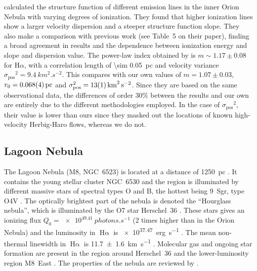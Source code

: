 \documentclass[fleqn,usenatbib, useAMS, a4paper]{mnras}
\newcounter{ionstage}
\renewcommand{\ion}[2]{\setcounter{ionstage}{#2}%
  \ensuremath{\mathrm{#1\,\scriptstyle\Roman{ionstage}}}}
\newcommand\hii{\ion{H}{2}}
\newcommand\pos{\ensuremath{_{\mathrm{pos}}}}
\newcommand\halpha{H${\alpha}$}
\newcommand\ha{\ensuremath{\text{H}\upalpha}}
\begin{document}
\citet{arthur2016turbulence} calculated the structure function of different emission lines in the inner Orion Nebula with varying degrees of ionization. 
They found that higher ionization lines show a larger velocity dispersion
and a steeper structure function slope. 
They also make a comparison with previous work (see Table~5 on their paper), finding a broad agreement in results and the dependence between ionization energy and slope and dispersion value.
The power-law index obtained by \citet{arthur2016turbulence} is \(m \sim 1.17 \pm 0.08\) for \halpha,
with a correlation length of \SI{\sim 0.05}{pc} and velocity variance
\(\sigma\pos^2= \SI{9.4}{km^{2 }.s^{-2}}\).
This compares with our own values of
\(m = 1.07 \pm 0.03\), \(r_0 = \SI{0.068 \pm 0.004}{pc}\)
and \(\sigma\pos^2 = \SI{13 \pm 1}{ km^{2}.s^{-2}}\). 
Since they are based on the same observational data,
the differences of order 30\% between the \citet{arthur2016turbulence}
results and our own are entirely due to the different methodologies employed.
In the case of \(\sigma\pos^2\), their value is lower than ours since
they masked out the locations of known high-velocity Herbig-Haro flows, whereas we do not.

\subsection{Lagoon Nebula}
\label{sec:lagoon-nebula}

The Lagoon Nebula (M8, NGC~6523) is located at a distance of \SI{1250}{pc}  \citetext{\SI{1}{\arcsecond} = \SI{0.006}{pc} ; \citealp{2005A&A...430..941P}}.
It contains the young stellar cluster NGC~6530 and the region is illuminated by different massive stars of spectral types O and B, the hottest being 9~Sgr, type O4V \citep{Damiani:2017b}.
The optically brightest part of the nebula is denoted the ``Hourglass nebula'',
which is illuminated by the O7 star Herschel~36 \citep{1986AJ.....91..870W}.
These stars gives an ionizing flux \(Q_0 = \SI{e49.41}{photons.s^{-1}}\) (2 times higher than in the Orion Nebula) and the luminosity in \ha{} is \SI{e37.47}{erg.s^{-1}} \citep{1984ApJ...287..116K}.
The mean non-thermal linewidth in \ha{} is \SI{11.7 \pm 1.6}{km.s^{-1}} \citep{1973ApJ...183..851B}.
Molecular gas and ongoing star formation are present in the region around
Herschel~36 \citep{Arias:2006e, Tiwari:2018a} and the lower-luminosity region
M8~East \citep{1984ApJ...278..170S, Tiwari:2020a}.
The properties of the nebula are reviewed by \citet{2008hsf2.book..533T}.
\end{document}
